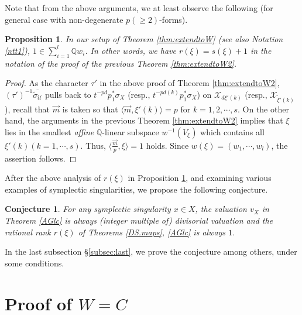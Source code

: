 \documentclass[12pt,a4paper]{amsart}
\newtheorem{Prop}[Thm]{Proposition}
\newtheorem{conj}[Thm]{Conjecture}
\theoremstyle{remark}
\theoremstyle{definition}
\def\Q{\mathbb{Q}}
\def\X{\mathcal{X}}
\begin{document}
Note that from the above arguments, we at least 
observe the following (for general case with 
non-degenerate $p(\ge 2)$-forms). 

\begin{Prop}\label{rands}
In our setup of Theorem \ref{thm:extendtoW} 
(see also Notation \ref{ntt1}), $1\in \sum_{i=1}^{l}\Q w_i$. 
In other words, we have $r(\xi)=s(\xi)+1$ in the notation of the 
proof of the previous Theorem \ref{thm:extendtoW2}. 
\end{Prop}

\begin{proof}
As the character $\tau'$ in the above 
proof of Theorem \ref{thm:extendtoW2}, 
$(\tau')^{-1} \overline{\tilde{\sigma}_{\mathcal{U}}}$ 
pulls back to $t^{-pd}p_1^* \sigma_X$ 
(resp., $t^{-pd(k)}p_1^* \sigma_X$) on $\X_{d\xi'(k)}$ (resp., $\X_{\tilde{\xi}'(k)}$), 
recall that $\vec{m}$ is taken so that 
$\langle \vec{m}, \xi'(k)\rangle =p$ 
 for $k=1,2,\cdots,s$. On the other hand, 
 the arguments in the previous Theorem 
 \ref{thm:extendtoW2} 
 implies that 
 $\xi$ lies in the smallest {\it affine}  
 $\Q$-linear subspace $w^{-1}(V_\xi)$ 
 which contains all 
 $\xi'(k) (k=1,\cdots,s)$. Thus, $\langle \frac{\vec{m}}{p},\xi\rangle=1$ holds. Since 
 $w(\xi)=(w_1,\cdots,w_l)$, the assertion follows. 
\end{proof}

After the above analysis of $r(\xi)$ in Proposition \ref{rands}, and 
examining various examples of symplectic singularities, 
we propose the following conjecture. 
\begin{conj}\label{r1conj}
For any symplectic singularity $x\in X$, 
the valuation $v_X$ in Theorem \ref{AGlc} is always 
(integer multiple of) divisorial valuation 
and the rational rank $r(\xi)$ of Theorems \ref{DS.maps}, \ref{AGlc} is 
always $1$. 
\end{conj}

In the last subsection \S \ref{subsec:last}, we 
prove the conjecture among others, under some conditions. 



\section{Proof of $W=C$}\label{sec:WC}
\end{document}
